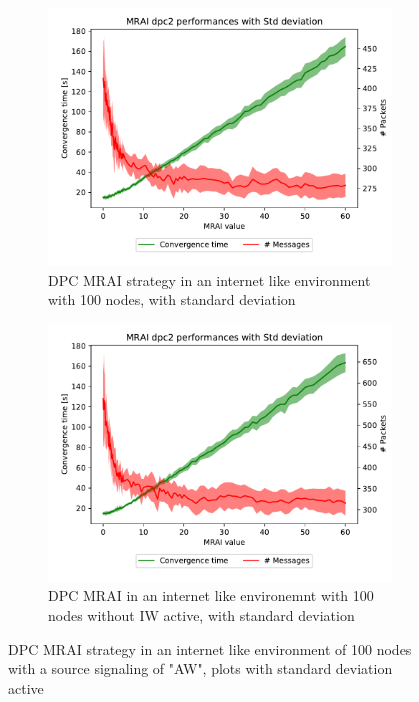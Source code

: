 \documentclass[10pt,conference,letterpaper]{IEEEtran}
\newcommand{\figwidth}{0.78}
\newcommand{\figvspace}{-1.5em}
\begin{document}
\begin{figure}[tb]
	\centering

	\begin{subfigure}{\columnwidth}
		\centering
		\includegraphics[width=\figwidth\columnwidth]{images/internet_like/S_AW/graph-100-dpc/pareto-internet_like-DPC_mrai_evolution_std_alpha.pdf}
		\caption{\ac{DPC} \ac{MRAI} strategy in an internet like environment with \num{100} nodes, with standard deviation}
		\label{fig:s_aw_dpc_mrai_IW_std}
		\qquad
	\end{subfigure}

	\begin{subfigure}{\columnwidth}
		\centering
		\includegraphics[width=\figwidth\columnwidth]{images/internet_like/S_AW/graph-100-dpc-noIW/pareto-internet_like-DPC-noIW_mrai_evolution_std_alpha.pdf}
		\caption{\ac{DPC} \ac{MRAI} in an internet like environemnt with \num{100} nodes without IW active, with standard deviation}
		\label{fig:s_aw_dpc_mrai_noIW_std}
		\qquad
	\end{subfigure}

	\caption{\ac{DPC} \ac{MRAI} strategy in an internet like environment of \num{100} nodes
			 with a source signaling of "AW", plots with standard deviation active}
	\label{fig:s_aw_dpc_mrai_std}
	\vspace{\figvspace}
\end{figure}
\end{document}
